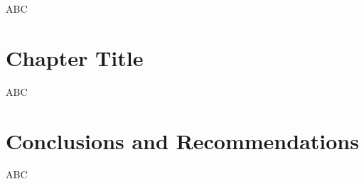 \documentclass[12pt]{report}
\begin{document}
\begin{mainf}
ABC

\clearpage




\chapter{Chapter Title}

ABC

\clearpage




\chapter{Conclusions and Recommendations}

ABC

\clearpage






\end{mainf}



\titleformat{\chapter}[hang]{\large\raggedright\bfseries}{\thechapter}{0 pt}{}
\titlespacing*{\chapter}{0pt}{-25 pt}{6 pt} %
\renewcommand\bibname{References}
{}
\setlength{\bibsep}{0pt}




\clearpage
\end{document}
